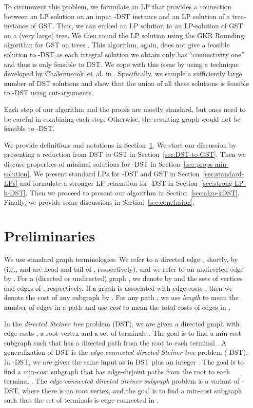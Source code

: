 \documentclass[11pt]{article}
\theoremstyle{definition}
\theoremstyle{remark}
\begin{document}
To circumvent this problem, we formulate an LP that provides a
connection between an LP solution on an input -DST instance 
and an LP solution of a tree-instance of GST. 
Thus, we can embed an LP solution to an LP-solution of GST on a 
(very large) tree.
We then round the LP solution using the GKR Rounding algorithm for GST on
trees \cite{GargKR00}.
This algorithm, again, does not give a feasible solution to -DST as
each integral solution we obtain only has ``connectivity one'' 
and thus is only feasible to DST.
We cope with this issue by using a technique 
developed by Chalermsook~et~al. in \cite{ChalermsookGL15}.
Specifically, we sample a sufficiently large number of
DST solutions and show that the union of all these solutions
is feasible to -DST using cut-arguments.


Each step of our algorithm and the proofs are mostly standard,
but ones need to be careful in combining each step.
Otherwise, the resulting graph would not be feasible to -DST.

\medskip{}
We provide definitions and notations in Section~\ref{sec:prelim}. 
We start our discussion by presenting a reduction from DST to GST
in Section~\ref{sec:DST-to-GST}.
Then we discuss properties of minimal solutions for -DST
in Section~\ref{sec:props-min-solution}.
We present standard LPs for -DST and GST in
Section~\ref{sec:standard-LPs}
and formulate a stronger LP-relaxation for -DST in
Section~\ref{sec:strong-LP-k-DST}.
Then we proceed to present our algorithm in
Section~\ref{sec:algo-kDST}. 
Finally, we provide some discussions in Section~\ref{sec:conclusion}.

\section{Preliminaries}
\label{sec:prelim}

We use standard graph terminologies. 
We refer to a directed edge , shortly, by 
(i.e.,  and  are head and tail of , respectively),
and we refer to an undirected edge by .
For a (directed or undirected) graph , we denote by  and 
the sets of vertices and edges of , respectively.
If a graph  is associated with edge-costs , 
then we denote the cost of any subgraph  by
.
For any path , 
we use {\em length} to mean the number of edges in a path  and
use {\em cost} to mean the total costs of edges in .


In the {\em directed Steiner tree} problem (DST), 
we are given a directed graph  with edge-costs , 
a root vertex  and a set of terminals .
The goal is to find a min-cost subgraph  such that
 has a directed path from the root  to each terminal .
A generalization of DST is the 
{\em  edge-connected directed Steiner tree} problem (-DST).
In -DST, we are given the same input as in DST plus an integer . 
The goal is to find a min-cost subgraph  that has  edge-disjoint
paths from the root  to each terminal .
The {\em  edge-connected directed Steiner subgraph} problem
is a variant of -DST, where there is no root vertex, and
the goal is to find a min-cost subgraph  such that
the set of terminals  is  edge-connected in . 
\end{document}
